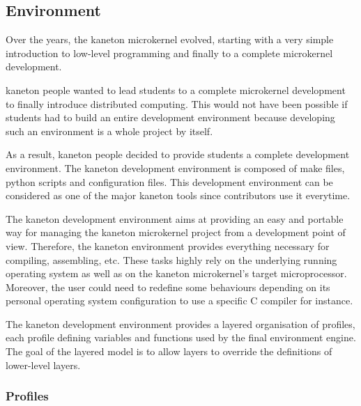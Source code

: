 %
%
%
%
%
%

%
%

\subsection{Environment}
\label{section:environment}

Over the years, the kaneton microkernel evolved, starting with a very simple
introduction to low-level programming and finally to a complete microkernel
development.

kaneton people wanted to lead students to a complete microkernel development
to finally introduce distributed computing. This would not have been possible
if students had to build an entire development environment because developing
such an environment is a whole project by itself.

As a result, kaneton people decided to provide students a complete development
environment. The kaneton development environment is composed of make files,
python scripts and configuration files. This development environment can be
considered as one of the major kaneton tools since contributors use it
everytime.

The kaneton development environment aims at providing an easy and portable
way for managing the kaneton microkernel project from a development point
of view. Therefore, the kaneton environment provides everything necessary
for compiling, assembling, etc. These tasks highly rely on the underlying
running operating system as well as on the kaneton microkernel's target
microprocessor. Moreover, the user could need to redefine some behaviours
depending on its personal operating system configuration to use a specific
C compiler for instance.

The kaneton development environment provides a layered organisation of
profiles, each profile defining variables and functions used by the final
environment engine. The goal of the layered model is to allow layers to
override the definitions of lower-level layers.

%
%

\subsubsection{Profiles}

